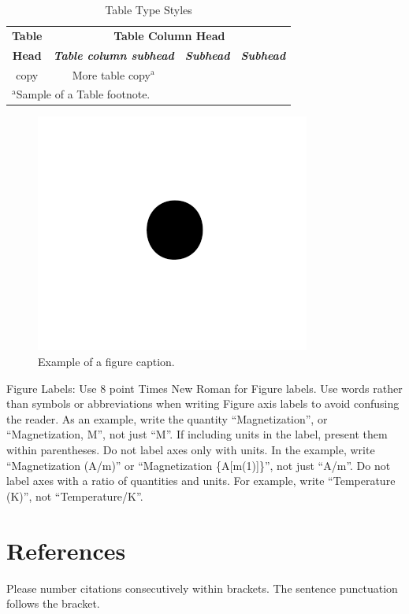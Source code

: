\documentclass[conference]{IEEEtran}
\begin{document}
\begin{table}[htbp]
\caption{Table Type Styles}
\begin{center}
\begin{tabular}{|c|c|c|c|}
\hline
\textbf{Table}&\multicolumn{3}{|c|}{\textbf{Table Column Head}} \\
\cline{2-4} 
\textbf{Head} & \textbf{\textit{Table column subhead}}& \textbf{\textit{Subhead}}& \textbf{\textit{Subhead}} \\
\hline
copy& More table copy$^{\mathrm{a}}$& &  \\
\hline
\multicolumn{4}{l}{$^{\mathrm{a}}$Sample of a Table footnote.}
\end{tabular}
\label{tab1}
\end{center}
\end{table}

\begin{figure}[htbp]
\centerline{\includegraphics{fig1.png}}
\caption{Example of a figure caption.}
\label{fig}
\end{figure}

Figure Labels: Use 8 point Times New Roman for Figure labels. Use words 
rather than symbols or abbreviations when writing Figure axis labels to 
avoid confusing the reader. As an example, write the quantity 
``Magnetization'', or ``Magnetization, M'', not just ``M''. If including 
units in the label, present them within parentheses. Do not label axes only 
with units. In the example, write ``Magnetization (A/m)'' or ``Magnetization 
\{A[m(1)]\}'', not just ``A/m''. Do not label axes with a ratio of 
quantities and units. For example, write ``Temperature (K)'', not 
``Temperature/K''.

\section*{References}

Please number citations consecutively within brackets. The 
sentence punctuation follows the bracket.

{
\balance{
  
  
  }
}
\end{document}
